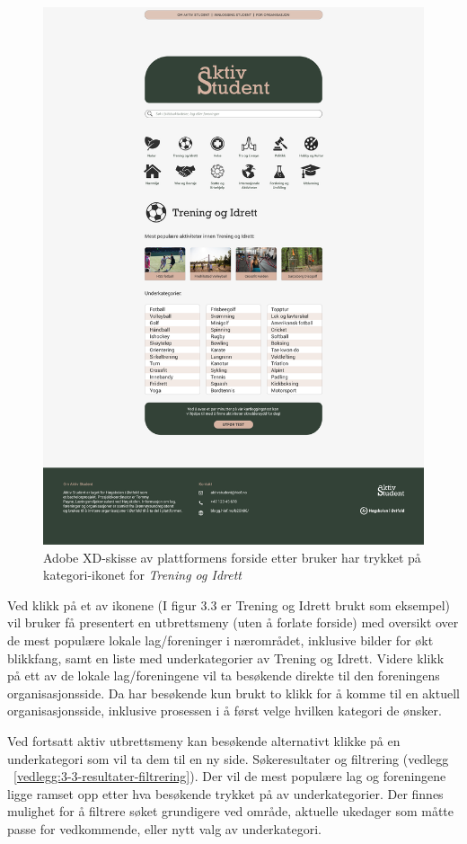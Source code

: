 \begin{figure}[H]
\centering
\includegraphics[width=.7\textwidth]{Illustrasjoner/Skisser-pdf/3.0/3-2-forside-trykket-kategori.pdf}
\caption{Adobe XD-skisse av plattformens forside etter bruker har trykket på kategori-ikonet for {\em Trening og Idrett}}
\label{fig:3-2-forside-utbrett}
\end{figure}


Ved klikk på et av ikonene (I figur 3.3 er Trening og Idrett brukt som eksempel) vil bruker få presentert en utbrettsmeny (uten å forlate forside) med oversikt over de mest populære lokale lag/foreninger i nærområdet, inklusive bilder for økt blikkfang, samt en liste med underkategorier av Trening og Idrett. Videre klikk på ett av de lokale lag/foreningene vil ta besøkende direkte til den foreningens organisasjonsside. Da har besøkende kun brukt to klikk for å komme til en aktuell organisasjonsside, inklusive prosessen i å først velge hvilken kategori de ønsker.

Ved fortsatt aktiv utbrettsmeny kan besøkende alternativt klikke på en underkategori som vil ta dem til en ny side. Søkeresultater og filtrering (vedlegg ~\ref{vedlegg:3-3-resultater-filtrering}). Der vil de mest populære lag og foreningene ligge ramset opp etter hva besøkende trykket på av underkategorier. Der finnes mulighet for å filtrere søket grundigere ved område, aktuelle ukedager som måtte passe for vedkommende, eller nytt valg av underkategori.

